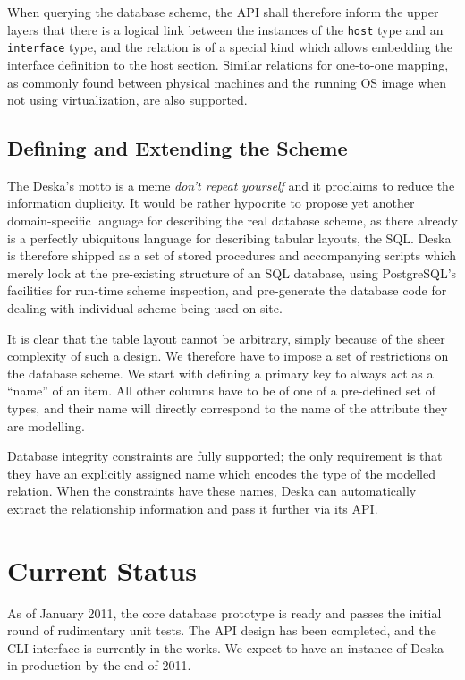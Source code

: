 \documentclass[a4paper]{jpconf}
\begin{document}
When querying the database scheme, the API shall therefore inform the upper layers that there is a logical link between the instances
of the {\tt host} type and an {\tt interface} type, and the relation is of a special kind which allows embedding the interface
definition to the host section.  Similar relations for one-to-one mapping, as commonly found between physical machines and the running
OS image when not using virtualization, are also supported.

\subsection{Defining and Extending the Scheme}

The Deska's motto is a meme {\em don't repeat yourself} and it proclaims to reduce the information duplicity.  It would be rather
hypocrite to propose yet another domain-specific language for describing the real database scheme, as there already is a perfectly
ubiquitous language for describing tabular layouts, the SQL.  Deska is therefore shipped as a set of stored procedures and accompanying
scripts which merely look at the pre-existing structure of an SQL database, using PostgreSQL's facilities for run-time scheme inspection,
and pre-generate the database code for dealing with individual scheme being used on-site.

It is clear that the table layout cannot be arbitrary, simply because of the sheer complexity of such a design.  We therefore have to
impose a set of restrictions on the database scheme.  We start with defining a primary key to always act as a ``name'' of an item.  All
other columns have to be of one of a pre-defined set of types, and their name will directly correspond to the name of the attribute
they are modelling.

Database integrity constraints are fully supported; the only requirement is that they have an explicitly assigned name which encodes
the type of the modelled relation.  When the constraints have these names, Deska can automatically extract the relationship information
and pass it further via its API.

\section{Current Status}

As of January 2011, the core database prototype is ready and passes the initial round of rudimentary unit tests.  The API design has
been completed, and the CLI interface is currently in the works. We expect to have an instance of Deska in production by the end of
2011.
\end{document}
